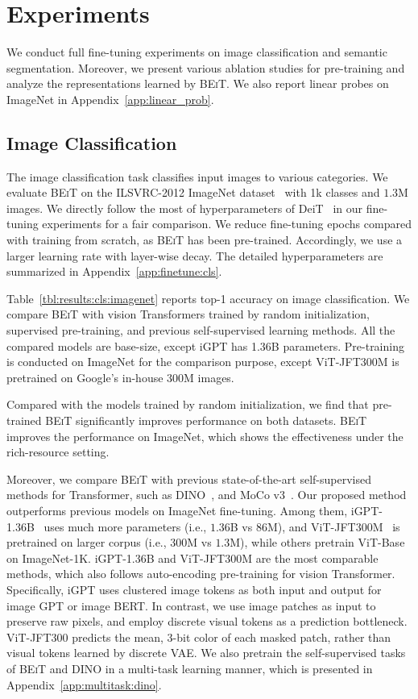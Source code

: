 \documentclass{article}
\newcommand\our{\textsc{BEiT}}
\begin{document}
\section{Experiments}
\label{sec:exp}

We conduct full fine-tuning experiments on image classification and semantic segmentation.
Moreover, we present various ablation studies for pre-training and analyze the representations learned by \our{}. 
We also report linear probes on ImageNet in Appendix~\ref{app:linear_prob}.

\subsection{Image Classification}
\label{sec:image:cls}

The image classification task classifies input images to various categories.
We evaluate \our{} on the ILSVRC-2012 ImageNet dataset~\citep{imagenet} with 1k classes and $1.3$M images.
We directly follow the most of hyperparameters of DeiT~\citep{deit} in our fine-tuning experiments for a fair comparison.
We reduce fine-tuning epochs compared with training from scratch, as \our{} has been pre-trained.
Accordingly, we use a larger learning rate with layer-wise decay.
The detailed hyperparameters are summarized in Appendix~\ref{app:finetune:cls}.

Table~\ref{tbl:results:cls:imagenet} reports top-1 accuracy on image classification.
We compare \our{} with vision Transformers trained by random initialization, supervised pre-training, and previous self-supervised learning methods.
All the compared models are base-size, except iGPT has 1.36B parameters.
Pre-training is conducted on ImageNet for the comparison purpose, except ViT-JFT300M is pretrained on Google's in-house $300$M images.

Compared with the models trained by random initialization, we find that pre-trained \our{} significantly improves performance on both datasets.
\our{} improves the performance on ImageNet, which shows the effectiveness under the rich-resource setting.

Moreover, we compare \our{} with previous state-of-the-art self-supervised methods for Transformer, such as DINO~\citep{dino}, and MoCo v3~\citep{mocov3}.
Our proposed method outperforms previous models on ImageNet fine-tuning.
Among them, iGPT-1.36B~\citep{igpt} uses much more parameters (i.e., $1.36$B vs $86$M), and ViT-JFT300M~\citep{vit} is pretrained on larger corpus (i.e., $300$M vs $1.3$M), while others pretrain ViT-Base on ImageNet-1K.
iGPT-1.36B and ViT-JFT300M are the most comparable methods, which also follows auto-encoding pre-training for vision Transformer.
Specifically, iGPT uses clustered image tokens as both input and output for image GPT or image BERT.
In contrast, we use image patches as input to preserve raw pixels, and employ discrete visual tokens as a prediction bottleneck.
ViT-JFT300 predicts the mean, 3-bit color of each masked patch, rather than visual tokens learned by discrete VAE.
We also pretrain the self-supervised tasks of \our{} and DINO in a multi-task learning manner, which is presented in Appendix~\ref{app:multitask:dino}.
\end{document}
